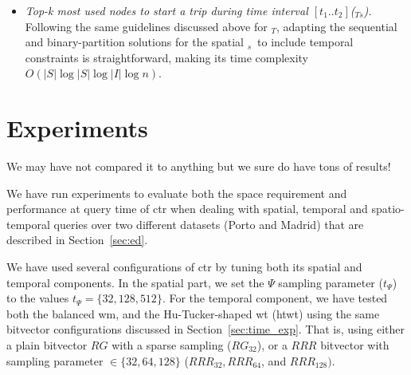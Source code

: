 \begin{itemize}
\begin{itemize}
	\end{itemize}


	\item {\em Top-k most used nodes to start a trip during time interval $[t_1..t_2]$(\topK$_{Ts}$).}
	Following the same guidelines discussed above for \topK$_T$, adapting the  sequential and 
	binary-partition solutions for the spatial \topK$_s$\ to include temporal constraints is straightforward, making its time complexity $O(|S|\log|S|\log|I|\log n)$.
	\end{itemize}


\section{Experiments}
	We may have not compared it to anything but we sure do have tons of results!

	We have run experiments to evaluate both the space requirement and performance at query time of \gls{ctr}
	when dealing with spatial, temporal and spatio-temporal queries over two different datasets 
	(Porto and Madrid) that are described in Section~\ref{sec:ed}. 

	We have used several configurations of \gls{ctr} by tuning both its
	spatial and temporal components. In the spatial part, %
	we set the  $\Psi$ sampling parameter ($t_{\Psi}$) to the values $t_{\Psi} = \{32, 128, 512\}$. 
	For the temporal component, %
	we have tested both the 
	balanced \gls{wm}, and the Hu-Tucker-shaped \gls{wt} (\gls{htwt}) using the same bitvector configurations
	discussed in Section~\ref{sec:time_exp}. That is, using either a plain bitvector $RG$ with a 
	sparse sampling ($RG_{32}$), or a $RRR$ bitvector with sampling parameter $\in \{32,64,128\}$ 
	($RRR_{32}, RRR_{64}$, and $ RRR_{128})$.


